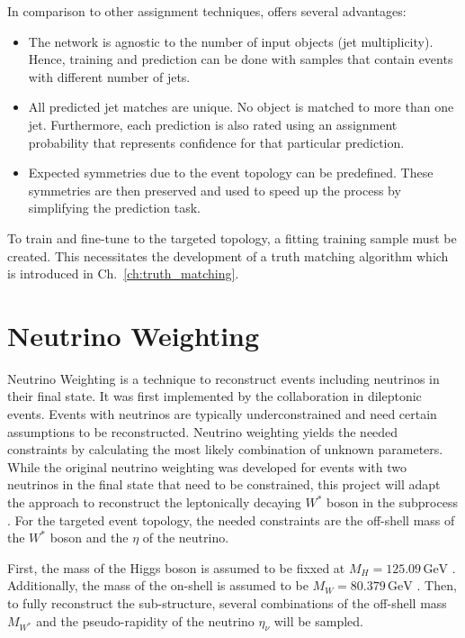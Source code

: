 \documentclass[bachelor,ngerman,english]{GAUBM}
\begin{document}
In comparison to other assignment techniques, \spanet offers several advantages: \cite{spanet_01}

\begin{itemize}
    \item The network is agnostic to the number of input objects (jet multiplicity). Hence, training and prediction can be done with samples that contain events with different number of jets.
    \item All predicted jet matches are unique. No object is matched to more than one jet. Furthermore, each prediction is also rated using an assignment probability that represents \spanets confidence for that particular prediction.
    \item Expected symmetries due to the event topology can be predefined. These symmetries are then preserved and used to speed up the process by simplifying the prediction task. 
\end{itemize}

To train and fine-tune \spanet to the targeted topology, a fitting training sample must be created. This necessitates the development of a truth matching algorithm which is introduced in Ch.~\ref{ch:truth_matching}.


\chapter{Neutrino Weighting}
\label{ch:neutrino_weighting}
Neutrino Weighting is a technique to reconstruct events including neutrinos in their final state. It was first implemented by the \dzero collaboration \cite{neutrino_weighting:original} in dileptonic \ttbar events. Events with neutrinos are typically underconstrained and need certain assumptions to be reconstructed. Neutrino weighting yields the needed constraints by calculating the most likely combination of unknown parameters. While the original neutrino weighting was developed for events with two neutrinos in the final state that need to be constrained, this project will adapt the approach to reconstruct the leptonically decaying $W^*$ boson in the \HWW subprocess \cite{neutrino_weighting:adaptation}. For the targeted event topology, the needed constraints are the off-shell mass of the $W^*$ boson and the $\eta$ of the neutrino.  

First, the mass of the Higgs boson is assumed to be fixxed at $M_H=125.09\,\text{GeV}$ \cite{pdg}. Additionally, the mass of the on-shell \wboson is assumed to be $M_W=80.379\,\text{GeV}$ \cite{pdg}. Then, to fully reconstruct the \HWW sub-structure, several combinations of the off-shell mass $M_{W^*}$ and the pseudo-rapidity of the neutrino $\eta_\nu$ will be sampled. 
\end{document}
